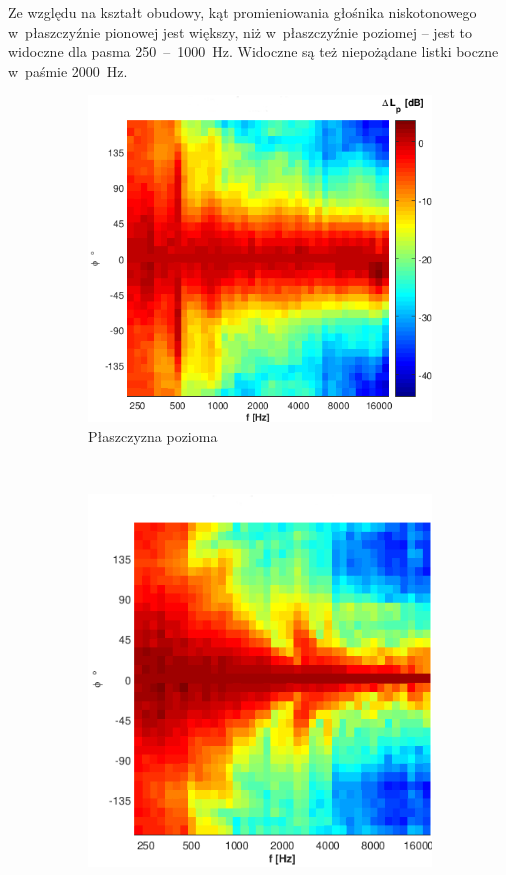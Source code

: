 \documentclass[12pt]{oska}
\newcommand{\range}[2]{\num{#1}~--~\num{#2}}
\begin{document}
	Ze względu na kształt obudowy, kąt promieniowania głośnika niskotonowego w~płaszczyźnie pionowej jest większy, niż w~płaszczyźnie poziomej -- jest to widoczne dla pasma \range{250}{1000}~\si{\hertz}. Widoczne są też niepożądane listki boczne w~paśmie \SI{2000}{\hertz}.
	
	\begin{figure}[!ht]
		\centering
		\begin{subfigure}[b]{.52\textwidth}
			\includegraphics[width=\textwidth]{poziom_H.png}
			\caption{Płaszczyzna pozioma}
			\label{r:H_poziom}
		\end{subfigure}
		~
		\begin{subfigure}[b]{.46\textwidth}
			\includegraphics[width=\textwidth]{pion_H.png}

\end{subfigure}
\end{figure}
\end{document}

